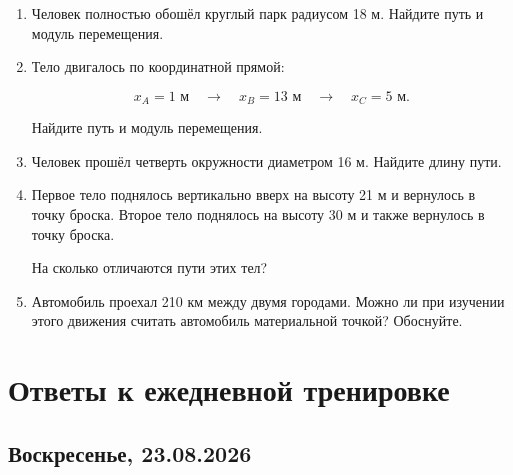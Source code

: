 \documentclass[a4paper,12pt]{article}
\begin{document}
\begin{enumerate}[label=\arabic*.]

\item
Человек полностью обошёл круглый парк
радиусом 18 м.
Найдите путь и модуль перемещения.

\item
Тело двигалось по координатной прямой:

\[
x_A=1\text{ м}
\quad\longrightarrow\quad
x_B=13\text{ м}
\quad\longrightarrow\quad
x_C=5\text{ м}.
\]

Найдите путь и модуль перемещения.

\item
Человек прошёл четверть окружности
диаметром 16 м.
Найдите длину пути.

\item
Первое тело поднялось вертикально вверх
на высоту 21 м и вернулось в точку броска.
Второе тело поднялось на высоту 30 м
и также вернулось в точку броска.

На сколько отличаются пути этих тел?

\item
Автомобиль проехал 210 км между двумя городами.
Можно ли при изучении этого движения
считать автомобиль материальной точкой?
Обоснуйте.

\end{enumerate}


\newpage

\section*{Ответы к ежедневной тренировке}


\subsection*{\textcolor{darkaccent}{Воскресенье, 23.08.2026}}
\end{document}
